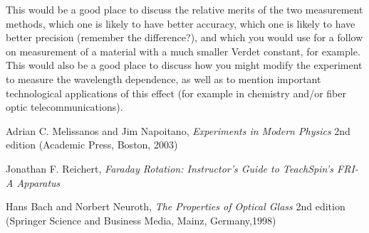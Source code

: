 \documentclass[prb,preprint]{revtex4-1}
\begin{document}
{\color{blue} This would be a good place to discuss the relative merits of the two measurement methods, which one is likely to have better accuracy, which one is likely to have better precision (remember the difference?), and which you would use for a follow on measurement of a material with a much smaller Verdet constant, for example. This would also be a good place to discuss how you might modify the experiment to measure the wavelength dependence, as well as to mention important technological applications of this effect (for example in chemistry and/or fiber optic telecommunications). }
\begin{thebibliography}{3}

 Adrian C. Melissanos and Jim Napoitano, \textit{Experiments in Modern Physics} 2nd edition (Academic Press, Boston, 2003)

 Jonathan F. Reichert, \textit{Faraday Rotation: Instructor's Guide to TeachSpin's FRI-A Apparatus}

 Hans Bach and Norbert Neuroth, \textit{The Properties of Optical Glass} 2nd edition (Springer Science and Business Media, Mainz, Germany,1998)

\end{thebibliography}
\end{document}
